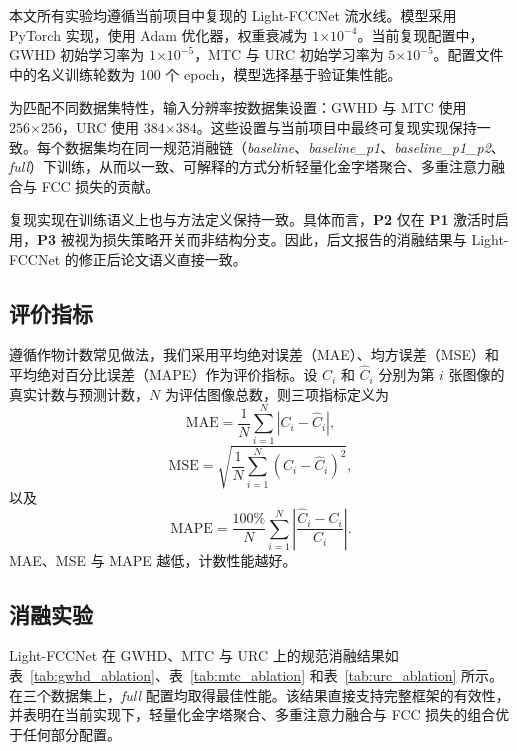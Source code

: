 \documentclass[a4paper,fleqn]{cas-sc}
\begin{document}
本文所有实验均遵循当前项目中复现的 Light-FCCNet 流水线。模型采用 PyTorch 实现，使用 Adam 优化器，权重衰减为 $1\text{×}10^{-4}$。当前复现配置中，GWHD 初始学习率为 $1\text{×}10^{-5}$，MTC 与 URC 初始学习率为 $5\text{×}10^{-5}$。配置文件中的名义训练轮数为 100 个 epoch，模型选择基于验证集性能。

为匹配不同数据集特性，输入分辨率按数据集设置：GWHD 与 MTC 使用 $256\text{×}256$，URC 使用 $384\text{×}384$。这些设置与当前项目中最终可复现实现保持一致。每个数据集均在同一规范消融链（\textit{baseline}、\textit{baseline\_p1}、\textit{baseline\_p1\_p2}、\textit{full}）下训练，从而以一致、可解释的方式分析轻量化金字塔聚合、多重注意力融合与 FCC 损失的贡献。

复现实现在训练语义上也与方法定义保持一致。具体而言，\textbf{P2} 仅在 \textbf{P1} 激活时启用，\textbf{P3} 被视为损失策略开关而非结构分支。因此，后文报告的消融结果与 Light-FCCNet 的修正后论文语义直接一致。

\subsection{评价指标}

遵循作物计数常见做法，我们采用平均绝对误差（MAE）、均方误差（MSE）和平均绝对百分比误差（MAPE）作为评价指标。设 $C_i$ 和 $\hat{C}_i$ 分别为第 $i$ 张图像的真实计数与预测计数，$N$ 为评估图像总数，则三项指标定义为
\begin{equation}
    \mathrm{MAE} = \frac{1}{N}\sum_{i=1}^{N}\left| C_i - \hat{C}_i \right|,
\end{equation}
\begin{equation}
    \mathrm{MSE} = \sqrt{\frac{1}{N}\sum_{i=1}^{N}\left( C_i - \hat{C}_i \right)^2},
\end{equation}
以及
\begin{equation}
    \mathrm{MAPE} = \frac{100\%}{N}\sum_{i=1}^{N}\left| \frac{\hat{C}_i - C_i}{C_i} \right|.
\end{equation}
MAE、MSE 与 MAPE 越低，计数性能越好。

\subsection{消融实验}

Light-FCCNet 在 GWHD、MTC 与 URC 上的规范消融结果如表~\ref{tab:gwhd_ablation}、表~\ref{tab:mtc_ablation} 和表~\ref{tab:urc_ablation} 所示。在三个数据集上，\textit{full} 配置均取得最佳性能。该结果直接支持完整框架的有效性，并表明在当前实现下，轻量化金字塔聚合、多重注意力融合与 FCC 损失的组合优于任何部分配置。
\end{document}
